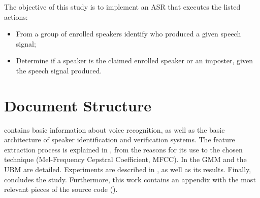 The objective of this study is to implement an ASR that executes the listed actions:

\begin{itemize}\itemsep0pt
    \item From a group of enrolled speakers identify who produced a given speech signal;
    \item Determine if a speaker is the claimed enrolled speaker or an imposter, given the speech signal produced.
\end{itemize}

\section{Document Structure}

 contains basic information about voice recognition, as well as the basic architecture of speaker identification and verification systems. The feature extraction process is explained in , from the reasons for its use to the chosen technique (Mel-Frequency Cepstral Coefficient, MFCC). In  the GMM and the UBM are detailed. Experiments are described in , as well as its results. Finally,  concludes the study. Furthermore, this work contains an appendix with the most relevant pieces of the source code ().